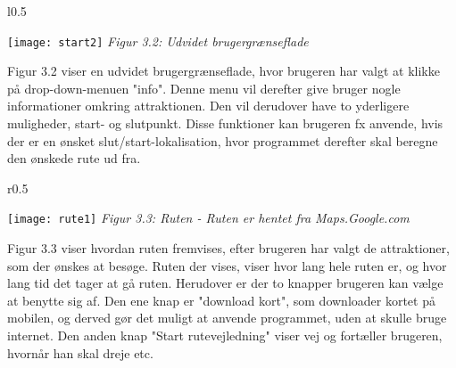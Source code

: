 \begin{wrapfigure}{l}{0.5\textwidth}
  \vspace{-20pt}
  \begin{center}
    \texttt{[image: start2]} \newline
    \textit{Figur 3.2: Udvidet brugergrænseflade}\newline
  \end{center}
  \vspace{-20pt}
  \vspace{-10pt}
\end{wrapfigure}


Figur 3.2 viser en udvidet brugergrænseflade, hvor brugeren har valgt at klikke på drop-down-menuen "info". Denne menu vil derefter give bruger nogle informationer omkring attraktionen. Den vil derudover have to yderligere muligheder, start- og slutpunkt. Disse funktioner kan brugeren fx anvende, hvis der er en ønsket slut/start-lokalisation, hvor programmet derefter skal beregne den ønskede rute ud fra.\newline
\newpage

\begin{wrapfigure}{r}{0.5\textwidth}
  \vspace{-20pt}
  \begin{center}
    \texttt{[image: rute1]} \newline
    \textit{Figur 3.3: Ruten - Ruten er hentet fra Maps.Google.com}\newline
  \end{center}
  \vspace{-20pt}
  \vspace{-10pt}
\end{wrapfigure}

Figur 3.3 viser hvordan ruten fremvises, efter brugeren har valgt de attraktioner, som der ønskes at besøge. Ruten der vises, viser hvor lang hele ruten er, og hvor lang tid det tager at gå ruten. Herudover er der to knapper brugeren kan vælge at benytte sig af. Den ene knap er "download kort", som downloader kortet på mobilen, og derved gør det muligt at anvende programmet, uden at skulle bruge internet. Den anden knap "Start rutevejledning" viser vej og fortæller brugeren, hvornår han skal dreje etc. 
\newline
\newline
\newline
\newline
\newline
\newline

